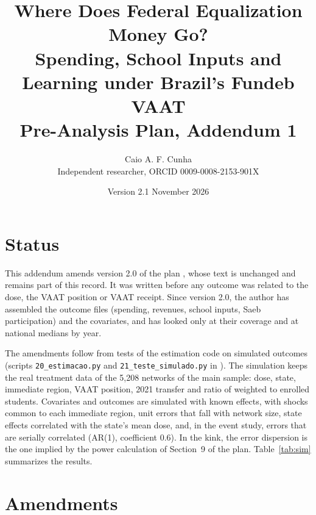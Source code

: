 \documentclass[11pt]{article}
\title{Where Does Federal Equalization Money Go?\\ Spending, School Inputs and Learning under Brazil's Fundeb VAAT\\[6pt]
\large Pre-Analysis Plan, Addendum 1}
\author{Caio A. F. Cunha\\ \small Independent researcher, ORCID 0009-0008-2153-901X}
\date{Version 2.1 \quad November 2026}
\begin{document}
\maketitle

\section{Status}

This addendum amends version 2.0 of the plan \citep{cunha2026pap}, whose text is unchanged and remains part of this record. It was written before any outcome was related to the dose, the VAAT position or VAAT receipt. Since version 2.0, the author has assembled the outcome files (spending, revenues, school inputs, Saeb participation) and the covariates, and has looked only at their coverage and at national medians by year.

The amendments follow from tests of the estimation code on simulated outcomes (scripts \texttt{20\_estimacao.py} and \texttt{21\_teste\_simulado.py} in \citealp{cunha2026a}). The simulation keeps the real treatment data of the 5,208 networks of the main sample: dose, state, immediate region, VAAT position, 2021 transfer and ratio of weighted to enrolled students. Covariates and outcomes are simulated with known effects, with shocks common to each immediate region, unit errors that fall with network size, state effects correlated with the state's mean dose, and, in the event study, errors that are serially correlated (AR(1), coefficient 0.6). In the kink, the error dispersion is the one implied by the power calculation of Section~9 of the plan. Table~\ref{tab:sim} summarizes the results.

\section{Amendments}
\end{document}
